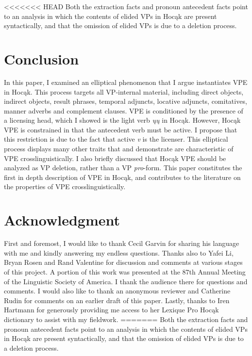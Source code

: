 \documentclass[output=paper]{LSP/langsci}
\begin{document}
<<<<<<< HEAD
Both the extraction facts and pronoun antecedent facts point to an analysis in which the contents of elided VPs in Hocąk are present syntactically, and that the omission of elided VPs is due to a deletion process.

\section{Conclusion}

In this paper, I examined an elliptical phenomenon that I argue instantiates VPE in Hocąk. This process targets all VP-internal material, including direct objects, indirect objects, result phrases, temporal adjuncts, locative adjuncts, comitatives, manner adverbs and complement clauses. VPE is conditioned by the presence of a licensing head, which I showed is the light verb \emph{ųų} in Hocąk. However, Hocąk VPE is constrained in that the antecedent verb must be active. I propose that this restriction is due to the fact that active \emph{v} is the licenser. This elliptical process displays many other traits that \citet{Goldberg2005} and \citet{Fortin2007} demonstrate are characteristic of VPE crosslinguistically. I also briefly discussed that Hocąk VPE should be analyzed as VP deletion, rather than a VP \emph{pro}-form. This paper constitutes the first in depth description of VPE in Hocąk, and contributes to the literature on the properties of VPE crosslinguistically. 

\section*{Acknowledgment}

First and foremost, I would like to thank Cecil Garvin for sharing his language with me and kindly answering my endless questions. Thanks also to Yafei Li, Bryan Rosen and Rand Valentine for discussion and comments at various stages of this project. A portion of this work was presented at the 87th Annual Meeting of the Linguistic Society of America. I thank the audience there for questions and comments. I would also like to thank an anonymous reviewer and Catherine Rudin for comments on an earlier draft of this paper. Lastly, thanks to Iren Hartmann for generously providing me access to her Lexique Pro Hocąk dictionary to assist with my fieldwork.
=======
Both the extraction facts and pronoun antecedent facts point to an analysis in which the contents of elided VPs in Hoc\k{a}k are present syntactically, and that the omission of elided VPs is due to a deletion process.
\end{document}
